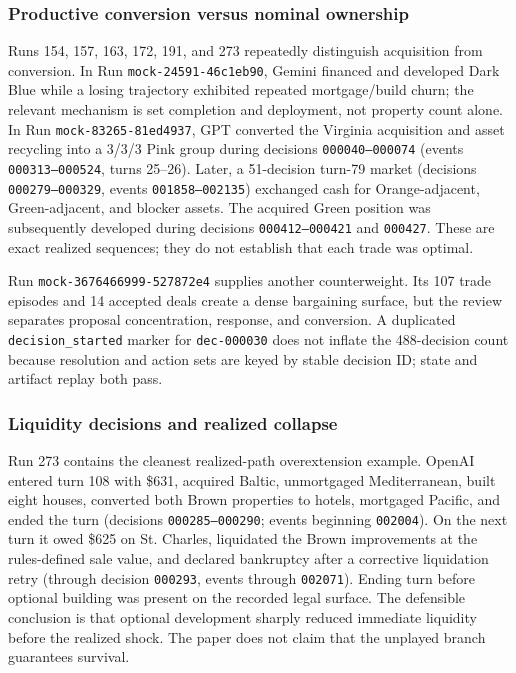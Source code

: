 \documentclass[conference]{IEEEtran}
\newcommand{\code}[1]{\texttt{#1}}
\begin{document}
\subsubsection{Productive conversion versus nominal ownership}

Runs 154, 157, 163, 172, 191, and 273 repeatedly distinguish acquisition from conversion. In Run \code{mock-24591-46c1eb90}, Gemini financed and developed Dark Blue while a losing trajectory exhibited repeated mortgage/build churn; the relevant mechanism is set completion and deployment, not property count alone. In Run \code{mock-83265-81ed4937}, GPT converted the Virginia acquisition and asset recycling into a 3/3/3 Pink group during decisions \code{000040--000074} (events \code{000313--000524}, turns 25--26). Later, a 51-decision turn-79 market (decisions \code{000279--000329}, events \code{001858--002135}) exchanged cash for Orange-adjacent, Green-adjacent, and blocker assets. The acquired Green position was subsequently developed during decisions \code{000412--000421} and \code{000427}. These are exact realized sequences; they do not establish that each trade was optimal.

Run \code{mock-3676466999-527872e4} supplies another counterweight. Its 107 trade episodes and 14 accepted deals create a dense bargaining surface, but the review separates proposal concentration, response, and conversion. A duplicated \code{decision\_started} marker for \code{dec-000030} does not inflate the 488-decision count because resolution and action sets are keyed by stable decision ID; state and artifact replay both pass.

\subsubsection{Liquidity decisions and realized collapse}

Run 273 contains the cleanest realized-path overextension example. OpenAI entered turn 108 with \$631, acquired Baltic, unmortgaged Mediterranean, built eight houses, converted both Brown properties to hotels, mortgaged Pacific, and ended the turn (decisions \code{000285--000290}; events beginning \code{002004}). On the next turn it owed \$625 on St. Charles, liquidated the Brown improvements at the rules-defined sale value, and declared bankruptcy after a corrective liquidation retry (through decision \code{000293}, events through \code{002071}). Ending turn before optional building was present on the recorded legal surface. The defensible conclusion is that optional development sharply reduced immediate liquidity before the realized shock. The paper does not claim that the unplayed branch guarantees survival.
\end{document}
